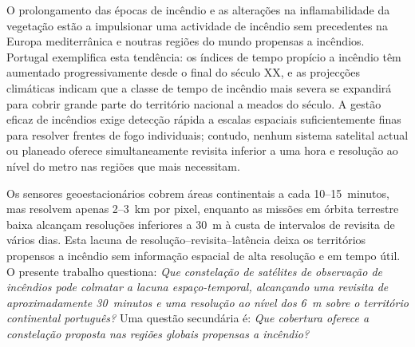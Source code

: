 
O prolongamento das épocas de incêndio e as alterações na inflamabilidade da vegetação estão a impulsionar uma actividade de incêndio sem precedentes na Europa mediterrânica e noutras regiões do mundo propensas a incêndios.
Portugal exemplifica esta tendência: os índices de tempo propício a incêndio têm aumentado progressivamente desde o final do século XX, e as projecções climáticas indicam que a classe de tempo de incêndio mais severa se expandirá para cobrir grande parte do território nacional a meados do século.
A gestão eficaz de incêndios exige detecção rápida a escalas espaciais suficientemente finas para resolver frentes de fogo individuais; contudo, nenhum sistema satelital actual ou planeado oferece simultaneamente revisita inferior a uma hora e resolução ao nível do metro nas regiões que mais necessitam.

Os sensores geoestacionários cobrem áreas continentais a cada 10--15~minutos, mas resolvem apenas 2--3~km por pixel, enquanto as missões em órbita terrestre baixa alcançam resoluções inferiores a 30~m à custa de intervalos de revisita de vários dias.
Esta lacuna de resolução--revisita--latência deixa os territórios propensos a incêndio sem informação espacial de alta resolução e em tempo útil.
O presente trabalho questiona: \emph{Que constelação de satélites de observação de incêndios pode colmatar a lacuna espaço-temporal, alcançando uma revisita de aproximadamente 30~minutos e uma resolução ao nível dos 6~m sobre o território continental português?} Uma questão secundária é: \emph{Que cobertura oferece a constelação proposta nas regiões globais propensas a incêndio?}

